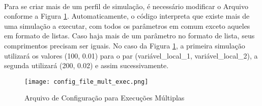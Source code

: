 \paragraph{} Para se criar mais de um perfil de simulação, é necessário modificar o Arquivo conforme a Figura \ref{fig:102}. Automaticamente, o código interpreta que existe mais de uma simulação a executar, com todos os parâmetros em comum exceto aqueles em formato de listas. Caso haja mais de um parâmetro no formato de lista, seus comprimentos precisam ser iguais. No caso da Figura \ref{fig:102}, a primeira simulação utilizará os valores (100, 0.01) para o par (variável\_local\_1, variável\_local\_2), a segunda utilizará (200, 0.02) e assim sucessivamente.

\begin{figure}[h]
    \texttt{[image: config\_file\_mult\_exec.png]}
    \centering
    \caption{Arquivo de Configuração para Execuções Múltiplas}
    \label{fig:102}
\end{figure}

